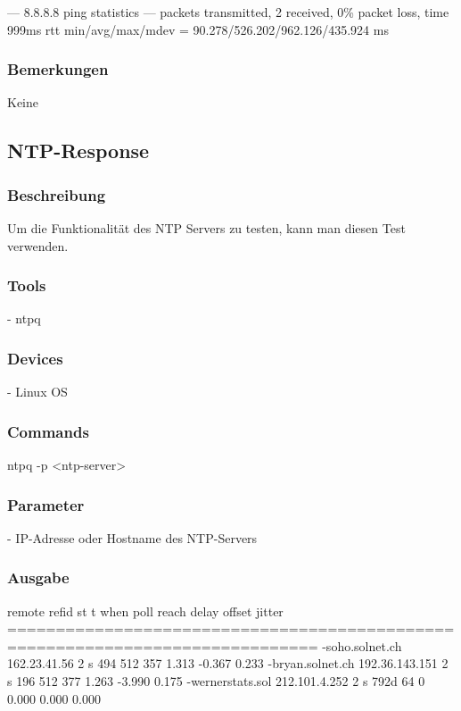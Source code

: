 \documentclass[a4,12pt]{scrartcl}
\begin{document}
--- 8.8.8.8 ping statistics --- packets transmitted, 2 received, 0\% packet loss, time 999ms\newline
rtt min/avg/max/mdev = 90.278/526.202/962.126/435.924 ms\newline

\subsubsection{Bemerkungen}
Keine
\subsection{NTP-Response}
\subsubsection{Beschreibung}
Um die Funktionalität des NTP Servers zu testen, kann man diesen Test verwenden.
\subsubsection{Tools}
- ntpq
\subsubsection{Devices}
- Linux OS
\subsubsection{Commands}
ntpq -p <ntp-server>
\subsubsection{Parameter}
- IP-Adresse oder Hostname des NTP-Servers
\subsubsection{Ausgabe}
     remote           refid      st t when poll reach   delay   offset  jitter\newline
==============================================================================\newline
-soho.solnet.ch  162.23.41.56     2 s  494  512  357    1.313   -0.367   0.233\newline
-bryan.solnet.ch 192.36.143.151   2 s  196  512  377    1.263   -3.990   0.175\newline
-wernerstats.sol 212.101.4.252    2 s 792d   64    0    0.000    0.000   0.000\newline
\end{document}
